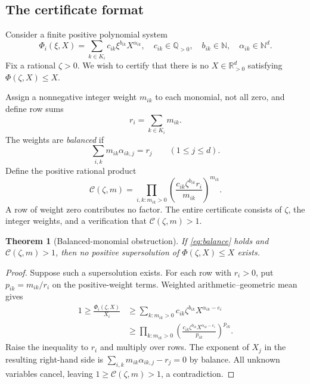 \documentclass[11pt,a4paper]{article}
\newtheorem{theorem}{Theorem}[section]
\theoremstyle{definition}
\theoremstyle{remark}
\newcommand{\R}{\mathbb R}
\newcommand{\Q}{\mathbb Q}
\newcommand{\N}{\mathbb N}
\begin{document}
\subsection{The certificate format}
Consider a finite positive polynomial system
\begin{equation}\label{eq:general-map}
 \Phi_i(\xi,X)=\sum_{k\in K_i}c_{ik}\xi^{b_{ik}}X^{\alpha_{ik}},
 \quad c_{ik}\in\Q_{>0},\quad b_{ik}\in\N,
 \quad \alpha_{ik}\in\N^d.
\end{equation}
Fix a rational $\zeta>0$. We wish to certify that there is no
$X\in\R_{>0}^d$ satisfying $\Phi(\zeta,X)\leq X$.

Assign a nonnegative integer weight $m_{ik}$ to each monomial, not all zero,
and define row sums
\[
 r_i=\sum_{k\in K_i}m_{ik}.
\]
The weights are \emph{balanced} if
\begin{equation}\label{eq:balance}
 \sum_{i,k}m_{ik}\alpha_{ik,j}=r_j\qquad(1\leq j\leq d).
\end{equation}
Define the positive rational product
\begin{equation}\label{eq:dual-product}
 \mathcal C(\zeta,m)=
 \prod_{i,k:m_{ik}>0}
 \left(\frac{c_{ik}\zeta^{b_{ik}}r_i}{m_{ik}}\right)^{m_{ik}}.
\end{equation}
A row of weight zero contributes no factor. The entire certificate consists
of $\zeta$, the integer weights, and a verification that
$\mathcal C(\zeta,m)>1$.

\begin{theorem}[Balanced-monomial obstruction]\label{thm:dual}
If \eqref{eq:balance} holds and $\mathcal C(\zeta,m)>1$, then no positive
supersolution of $\Phi(\zeta,X)\leq X$ exists.
\end{theorem}
\begin{proof}
Suppose such a supersolution exists. For each row with $r_i>0$, put
$p_{ik}=m_{ik}/r_i$ on the positive-weight terms. Weighted arithmetic--geometric
mean gives
\begin{align*}
 1\geq\frac{\Phi_i(\zeta,X)}{X_i}
 &\geq\sum_{k:m_{ik}>0}
        c_{ik}\zeta^{b_{ik}}X^{\alpha_{ik}-e_i}\\
 &\geq\prod_{k:m_{ik}>0}
 \left(\frac{c_{ik}\zeta^{b_{ik}}
                  X^{\alpha_{ik}-e_i}}{p_{ik}}\right)^{p_{ik}}.
\end{align*}
Raise the inequality to $r_i$ and multiply over rows. The exponent of $X_j$
in the resulting right-hand side is
$\sum_{i,k}m_{ik}\alpha_{ik,j}-r_j=0$ by balance.
All unknown variables cancel, leaving
$1\geq\mathcal C(\zeta,m)>1$, a contradiction.
\end{proof}
\end{document}
